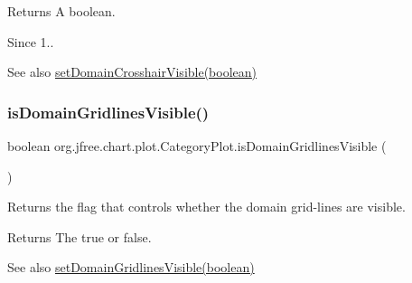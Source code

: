 \begin{DoxyReturn}{Returns}
A boolean.
\end{DoxyReturn}
\begin{DoxySince}{Since}
1..
\end{DoxySince}
\begin{DoxySeeAlso}{See also}
\mbox{\hyperlink{classorg_1_1jfree_1_1chart_1_1plot_1_1_category_plot_a2ab9eb722c31a8c3b1c179097cde043f}{set\+Domain\+Crosshair\+Visible(boolean)}} 
\end{DoxySeeAlso}
\mbox{\label{classorg_1_1jfree_1_1chart_1_1plot_1_1_category_plot_a597b375b0629f51761c50881045a2f99}} 
\subsubsection{\texorpdfstring{is\+Domain\+Gridlines\+Visible()}{isDomainGridlinesVisible()}}
{\footnotesize\ttfamily boolean org.\+jfree.\+chart.\+plot.\+Category\+Plot.\+is\+Domain\+Gridlines\+Visible (\begin{DoxyParamCaption}{ }\end{DoxyParamCaption})}

Returns the flag that controls whether the domain grid-\/lines are visible.

\begin{DoxyReturn}{Returns}
The {\ttfamily true} or {\ttfamily false}.
\end{DoxyReturn}
\begin{DoxySeeAlso}{See also}
\mbox{\hyperlink{classorg_1_1jfree_1_1chart_1_1plot_1_1_category_plot_a8abc131b37e368eda1d81c22974386ae}{set\+Domain\+Gridlines\+Visible(boolean)}} 
\end{DoxySeeAlso}
\mbox{\label{classorg_1_1jfree_1_1chart_1_1plot_1_1_category_plot_ac365d760808474f7b01fb0642a956f93}} 
